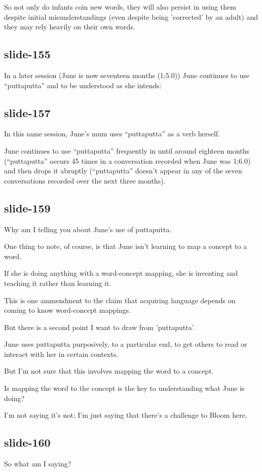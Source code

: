 \documentclass[12pt,\papersize]{extarticle}
\begin{document}
So not only do infants coin new words, they will also persist in using them despite initial misunderstandings (even despite being 'corrected' by an adult) and they may rely heavily on their own words.
 
\subsection{slide-155}
In a later session (June is now seventeen months (1;5.0)) June continues to use “puttaputta” and to be understood as she intends:
 
\subsection{slide-157}
In this same session, June's mum uses “puttaputta” as a verb herself.
 
June continues to use “puttaputta” frequently in until around eighteen months (“puttaputta” occurs 45 times in a conversation recorded when June was 1;6.0) and then drops it abruptly (“puttaputta” doesn't appear in any of the seven conversations recorded over the next three months).
 
\subsection{slide-159}
Why am I telling you about June's use of puttaputta.
 
One thing to note, of course, is that June isn't learning to map a concept to a word.
 
If she is doing anything with a word-concept mapping, she is inventing and teaching it rather than learning it.
 
This is one ammendment to the claim that acquiring language depends on coming to know word-concept mappings.
 
But there is a second point I  want to draw from 'puttaputta'.
 
June uses puttaputta purposively, to a particular end, to get others to read or interact with her in certain contexts.
 
But I'm not sure that this involves mapping the word to a concept.
 
Is mapping the word to the concept is the key to understanding what June is doing?
 
I'm not saying it's not; I'm just saying that there's a challenge to Bloom here.
 
\subsection{slide-160}
So what am I saying?
 
\end{document}
